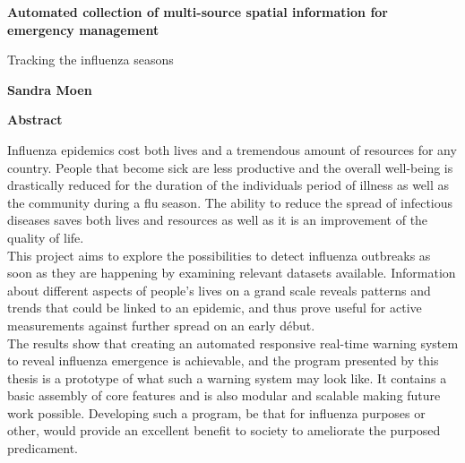 \thispagestyle{plain}
\begin{center}
	\Large
	\textbf{Automated collection of multi-source spatial information for emergency management}
	
	\vspace{0.4cm}
	\large
	Tracking the influenza seasons
	
	\vspace{0.4cm}
	\textbf{Sandra Moen}
	
	\vspace{0.9cm}
	\textbf{Abstract}
\end{center}
Influenza epidemics cost both lives and a tremendous amount of resources for any country. People that become sick are less productive and the overall well-being is drastically reduced for the duration of the individuals period of illness as well as the community during a flu season. The ability to reduce the spread of infectious diseases saves both lives and resources as well as it is an improvement of the quality of life. \\

This project aims to explore the possibilities to detect influenza outbreaks as soon as they are happening by examining relevant datasets available. Information about different aspects of people's lives on a grand scale reveals patterns and trends that could be linked to an epidemic, and thus prove useful for active measurements against further spread on an early début. \\

The results show that creating an automated responsive real-time warning system to reveal influenza emergence is achievable, and the program presented by this thesis is a prototype of what such a warning system may look like. It contains a basic assembly of core features and is also modular and scalable making future work possible. Developing such a program, be that for influenza purposes or other, would provide an excellent benefit to society to ameliorate the purposed predicament.